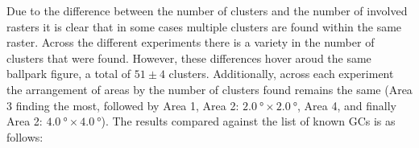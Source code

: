 Due to the difference between the number of clusters and the number of involved rasters it is clear that in some cases multiple clusters are found within the same raster. Across the different experiments there is a variety in the number of clusters that were found. However, these differences hover aroud the same ballpark figure, a total of $51\pm4$ clusters. Additionally, across each experiment the arrangement of areas by the number of clusters found remains the same (Area 3 finding the most, followed by Area 1, Area  2: $\SI{2.0}{\degree}\times\SI{2.0}{\degree}$, Area 4, and finally Area 2: $\SI{4.0}{\degree}\times\SI{4.0}{\degree}$). The results compared against the list of known GCs is as follows:
\begin{table}[H]
    \centering
    \caption{Known GCs Detected by Clustering}
    \label{tb:gcs-found-clustering}
\end{table}
